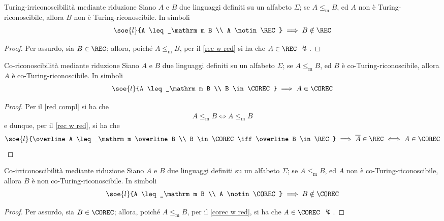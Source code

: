 \documentclass[a4paper, 12pt]{report}
\begin{document}
    \begin{framedcor}[label={rec w red cor}]{Turing-irriconoscibilità mediante riduzione}
        Siano $A$ e $B$ due linguaggi definiti su un alfabeto $\Sigma$; se $A \leq_\mathrm m B$, ed $A$ non è Turing-riconoscibile, allora $B$ non è Turing-riconoscibile. In simboli $$\soe{l}{A \leq_\mathrm m B \\ A \notin \REC} \implies B \notin \REC$$
    \end{framedcor}

    \begin{proof}
        Per assurdo, sia $B \in \REC$; allora, poiché $A \leq_\mathrm m B$, per il \cref{rec w red} si ha che $A \in \REC$ $\lightning$.
    \end{proof}

    \begin{framedcor}[label={corec w red}]{Co-riconoscibilità mediante riduzione}
        Siano $A$ e $B$ due linguaggi definiti su un alfabeto $\Sigma$; se $A \leq_\mathrm m B$, ed $B$ è co-Turing-riconoscibile, allora $A$ è co-Turing-riconoscibile. In simboli $$\soe{l}{A \leq_\mathrm m B \\ B \in \COREC} \implies A \in \COREC$$
    \end{framedcor}

    \begin{proof}
        Per il \cref{red compl} si ha che $$A \leq_\mathrm m B \iff \overline{A} \leq_\mathrm m \overline B$$ e dunque, per il \cref{rec w red}, si ha che $$\soe{l}{\overline A \leq_\mathrm m \overline B \\ B \in \COREC \iff \overline B \in \REC} \implies \overline A \in \REC \iff A \in \COREC$$ 
    \end{proof}

    \begin{framedcor}[label={corec w red cor}]{Co-irriconoscibilità mediante riduzione}
        Siano $A$ e $B$ due linguaggi definiti su un alfabeto $\Sigma$; se $A \leq_\mathrm m B$, ed $A$ non è co-Turing-riconoscibile, allora $B$ è non co-Turing-riconoscibile. In simboli $$\soe{l}{A \leq_\mathrm m B \\ A \notin \COREC} \implies B \notin \COREC$$
    \end{framedcor}

    \begin{proof}
        Per assurdo, sia $B \in \COREC$; allora, poiché $A \leq_\mathrm m B$, per il \cref{corec w red}, si ha che $A \in \COREC$ $\lightning$.
    \end{proof}
\end{document}
